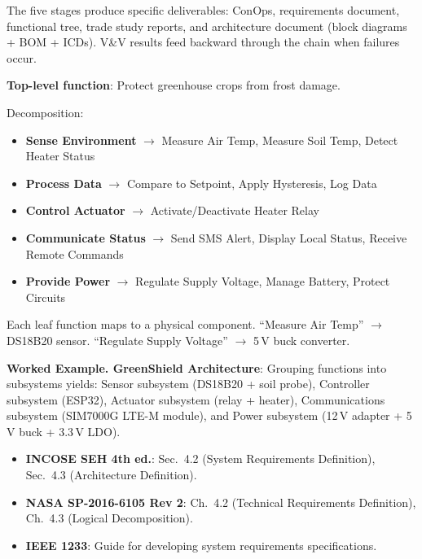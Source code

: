 The five stages produce specific deliverables: ConOps, requirements document, functional tree, trade study reports, and architecture document (block diagrams + BOM + ICDs). V\&V results feed backward through the chain when failures occur.


\begin{greenshieldbox}
\textbf{Top-level function}: Protect greenhouse crops from frost damage.

Decomposition:
\begin{itemize}[nosep,leftmargin=1.5em]
\item \textbf{Sense Environment} $\to$ Measure Air Temp, Measure Soil Temp, Detect Heater Status
\item \textbf{Process Data} $\to$ Compare to Setpoint, Apply Hysteresis, Log Data
\item \textbf{Control Actuator} $\to$ Activate/Deactivate Heater Relay
\item \textbf{Communicate Status} $\to$ Send SMS Alert, Display Local Status, Receive Remote Commands
\item \textbf{Provide Power} $\to$ Regulate Supply Voltage, Manage Battery, Protect Circuits
\end{itemize}
Each leaf function maps to a physical component. ``Measure Air Temp'' $\to$ DS18B20 sensor. ``Regulate Supply Voltage'' $\to$ 5\,V buck converter.

\textbf{Worked Example. GreenShield Architecture}: Grouping functions into subsystems yields: Sensor subsystem (DS18B20 + soil probe), Controller subsystem (ESP32), Actuator subsystem (relay + heater), Communications subsystem (SIM7000G LTE-M module), and Power subsystem (12\,V adapter + 5\,V buck + 3.3\,V LDO).
\end{greenshieldbox}

\begin{keyconceptbox}
\begin{itemize}[nosep,leftmargin=1.5em]
\item \textbf{INCOSE SEH 4th ed.}: Sec.\ 4.2 (System Requirements Definition), Sec.\ 4.3 (Architecture Definition).
\item \textbf{NASA SP-2016-6105 Rev 2}: Ch.\ 4.2 (Technical Requirements Definition), Ch.\ 4.3 (Logical Decomposition).
\item \textbf{IEEE 1233}: Guide for developing system requirements specifications.
\end{itemize}
\end{keyconceptbox}

